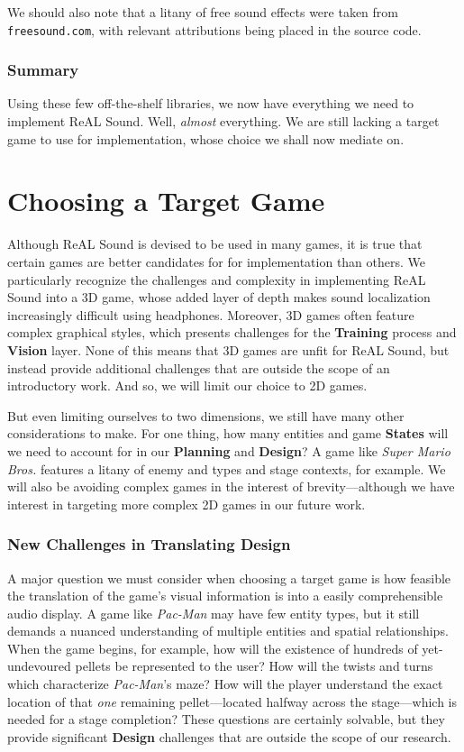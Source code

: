 \documentclass{report}
\newcommand{\rs}{ReAL Sound\xspace}
\newcommand{\plan}{\textbf{Planning}\xspace}
\newcommand{\train}{\textbf{Training}\xspace}
\newcommand{\design}{\textbf{Design}\xspace}
\newcommand{\state}[1]{\textbf{#1}}
\newcommand{\vision}{\textbf{Vision}\xspace}
\begin{document}
We should also note that a litany of free sound effects were taken from \texttt{freesound.com}, with relevant attributions being placed in the source code.

\subsubsection{Summary}
Using these few off-the-shelf libraries, we now have everything we need to implement \rs. Well, \emph{almost} everything. We are still lacking a target game to use for implementation, whose choice we shall now mediate on.

\section{Choosing a Target Game}

Although \rs is devised to be used in many games, it is true that certain games are better candidates for for implementation than others. We particularly recognize the challenges and complexity in implementing \rs into a 3D game, whose added layer of depth makes sound localization increasingly difficult using headphones. Moreover, 3D games often feature complex graphical styles, which presents challenges for the \train process and \vision layer. None of this means that 3D games are unfit for \rs, but instead provide additional challenges that are outside the scope of an introductory work. And so, we will limit our choice to 2D games.

But even limiting ourselves to two dimensions, we still have many other considerations to make. For one thing, how many entities and game \state{States} will we need to account for in our \plan and \design? A game like \emph{Super Mario Bros.} features a litany of enemy and types and stage contexts, for example. We will also be avoiding complex games in the interest of brevity---although we have interest in targeting more complex 2D games in our future work.

\subsubsection{New Challenges in Translating Design}

A major question we must consider when choosing a target game is how feasible the translation of the game's visual information is into a easily comprehensible audio display. A game like \emph{Pac-Man} may have few entity types, but it still demands a nuanced understanding of multiple entities and spatial relationships. When the game begins, for example, how will the existence of hundreds of yet-undevoured pellets be represented to the user? How will the twists and turns which characterize \emph{Pac-Man}'s maze? How will the player understand the exact location of that \emph{one} remaining pellet---located halfway across the stage---which is needed for a stage completion? These questions are certainly solvable, but they provide significant \design challenges that are outside the scope of our research. 
\end{document}
